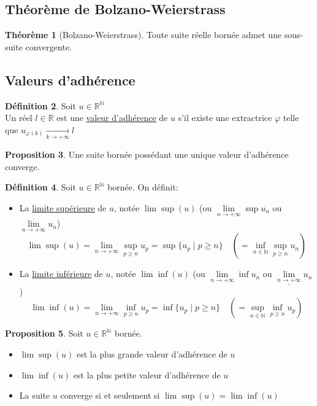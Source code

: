 \documentclass[10pt,a4paper]{article}
\theoremstyle{definition}
\newtheorem{proposition}{Proposition}[section]
\newtheorem{theorem}[proposition]{Théorème}
\newtheorem{definition}[proposition]{Définition}
\begin{document}
\subsection{Théorème de Bolzano-Weierstrass}
\begin{theorem}[Bolzano-Weierstrass]
Toute suite réelle bornée admet une sous-suite convergente.
\end{theorem}

\subsection{Valeurs d'adhérence}
\begin{definition}
Soit $u \in \mathbb{R}^\mathbb{N}$ \\
Un réel $l \in \mathbb{R}$ est une \uline{valeur d'adhérence} de $u$ s'il existe une extractrice $\varphi$ telle que $u_{\varphi(k)} \xrightarrow[k \to +\infty]{} l$
\end{definition}
\begin{proposition}
Une suite bornée possédant une unique valeur d'adhérence converge.
\end{proposition}
\begin{definition}
Soit $u \in \mathbb{R}^\mathbb{N}$ bornée. On définit:
\begin{itemize}
\item La \uline{limite supérieure} de $u$, notée $\lim \sup(u)$ (ou $\lim\limits_{n \to +\infty} \sup u_n$ ou $\overline{\lim\limits_{n \to +\infty}} u_n$)
\[\lim \sup(u) = \lim\limits_{n \to +\infty} \sup\limits_{p \geq n} u_p = \sup \{u_p \mid p \geq n\} \quad (= \inf\limits_{n \in \mathbb{N}} \sup\limits_{p \geq n} u_n)\]
\item La \uline{limite inférieure} de $u$, notée $\lim \inf(u)$ (ou $\lim\limits_{n \to +\infty} \inf u_n$ ou $\underline{\lim\limits_{n \to +\infty}} u_n$)
\[\lim \inf(u) = \lim\limits_{n \to +\infty} \inf\limits_{p \geq n} u_p = \inf \{u_p \mid p \geq n\} \quad (= \sup\limits_{n \in \mathbb{N}} \inf\limits_{p \geq n} u_p)\]
\end{itemize}
\end{definition}
\begin{proposition}
Soit $u \in \mathbb{R}^\mathbb{N}$ bornée.
\begin{itemize}
\item $\lim \sup(u)$ est la plus grande valeur d'adhérence de $u$
\item $\lim \inf(u)$ est la plus petite valeur d'adhérence de $u$
\item La suite $u$ converge si et seulement si $\lim \sup(u) = \lim \inf(u)$
\end{itemize}
\end{proposition}
\end{document}
